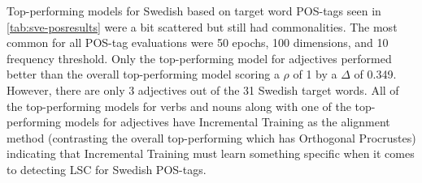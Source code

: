 Top-performing models for Swedish based on target word POS-tags seen in \autoref{tab:sve-posresults} were a bit scattered but still had commonalities. The most common for all POS-tag evaluations were 50 epochs, 100 dimensions, and 10 frequency threshold. Only the top-performing model for adjectives performed better than the overall top-performing model scoring a $\rho$ of 1 by a $\Delta$ of 0.349. However, there are only 3 adjectives out of the 31 Swedish target words. All of the top-performing models for verbs and nouns along with one of the top-performing models for adjectives have Incremental Training as the alignment method (contrasting the overall top-performing which has Orthogonal Procrustes) indicating that Incremental Training must learn something specific when it comes to detecting LSC for Swedish POS-tags. 

\bigskip
\bigskip

